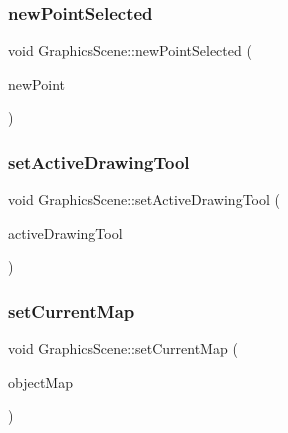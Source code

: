 \subsubsection{\texorpdfstring{new\+Point\+Selected}{newPointSelected}}
{\footnotesize\ttfamily void Graphics\+Scene\+::new\+Point\+Selected (\begin{DoxyParamCaption}\item[{Q\+PointF}]{new\+Point }\end{DoxyParamCaption})\hspace{0.3cm}{\ttfamily [signal]}}

\mbox{\label{class_graphics_scene_a99831b8b30259a344715f95d65427465}} 
\subsubsection{\texorpdfstring{set\+Active\+Drawing\+Tool}{setActiveDrawingTool}}
{\footnotesize\ttfamily void Graphics\+Scene\+::set\+Active\+Drawing\+Tool (\begin{DoxyParamCaption}\item[{const \hyperlink{class_draw_aef97a848de7a634c35c3ce678be88b9b}{Draw\+::\+Tool} \&}]{active\+Drawing\+Tool }\end{DoxyParamCaption})\hspace{0.3cm}{\ttfamily [slot]}}

\mbox{\label{class_graphics_scene_a48f32ef7c39d728cc7c7eb9d21dbffca}} 
\subsubsection{\texorpdfstring{set\+Current\+Map}{setCurrentMap}}
{\footnotesize\ttfamily void Graphics\+Scene\+::set\+Current\+Map (\begin{DoxyParamCaption}\item[{\hyperlink{class_graphics_object_map}{Graphics\+Object\+Map}}]{object\+Map }\end{DoxyParamCaption})\hspace{0.3cm}{\ttfamily [slot]}}

